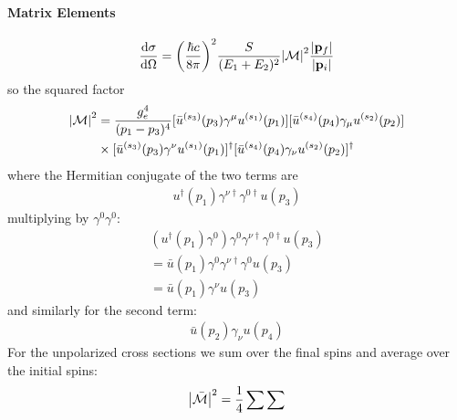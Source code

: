 \documentclass[../main.tex]{subfiles}
\begin{document}
\paragraph*{Matrix Elements}
\begin{align*}
    \dv{\sigma}{\Omega} = \qt(\frac{\hbar c}{8\pi})^2 \frac{S}{(E_1 + E_2)^2} \abs{\mathcal{M}}^2
    \frac{\abs{\vb p_f}}{\abs{\vb p_i}}
\end{align*}
so the squared factor 
\begin{align*}
    \abs{\mathcal{M}}^2 &= \frac{g_e^4}{(p_1 - p_3)^4} [\bar u^{(s_3)}(p_3) \gamma^\mu u^{(s_1)}(p_1)]
    [\bar u^{(s_4)}(p_4) \gamma_\mu u^{(s_2)}(p_2)] \\
    &\times [\bar u^{(s_3)}(p_3) \gamma^\nu u^{(s_1)}(p_1)]^\dagger
    [\bar u^{(s_4)}(p_4) \gamma_\nu u^{(s_2)}(p_2)]^\dagger
\end{align*}
where the Hermitian conjugate of the two terms are
\begin{align*}
    u^\dagger(p_1) \gamma^{\nu \dagger} \gamma^{0\dagger} u(p_3)
\end{align*}
multiplying by $\gamma^0 \gamma^0$:
\begin{align*}
    (u^\dagger(p_1) \gamma^0) \gamma^0 \gamma^{\nu \dagger} \gamma^{0\dagger} u(p_3) \\
    = \bar u(p_1) \gamma^0 \gamma^{\nu \dagger} \gamma^0 u(p_3) \\
    = \bar u(p_1) \gamma^\nu u(p_3)
\end{align*}
and similarly for the second term:
\begin{align*}
    \bar u(p_2) \gamma_\nu u(p_4)
\end{align*}
For the unpolarized cross sections we sum over the final spins and average over the initial spins:
\begin{align*}
    \abs{\mathcal{\bar M}}^2 = \frac{1}{4} \sum \sum
\end{align*}

\newpage
{}
\end{document}
